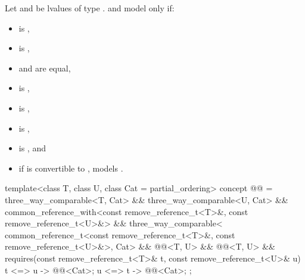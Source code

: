 \pnum
Let  and  be lvalues
of type .
 and 
model  only if:
\begin{itemize}
\item
   is ,
\item
   is ,
\item
   and  are equal,
\item
   is ,
\item
   is ,
\item
   is ,
\item
   is , and
\item
  if  is convertible to ,  models
  .
\end{itemize}

%
\begin{codeblock}
template<class T, class U, class Cat = partial_ordering>
  concept @@ =
    three_way_comparable<T, Cat> &&
    three_way_comparable<U, Cat> &&
    common_reference_with<const remove_reference_t<T>&, const remove_reference_t<U>&> &&
    three_way_comparable<
      common_reference_t<const remove_reference_t<T>&, const remove_reference_t<U>&>, Cat> &&
    @@<T, U> &&
    @@<T, U> &&
    requires(const remove_reference_t<T>& t, const remove_reference_t<U>& u) {
      { t <=> u } -> @@<Cat>;
      { u <=> t } -> @@<Cat>;
    };
\end{codeblock}

